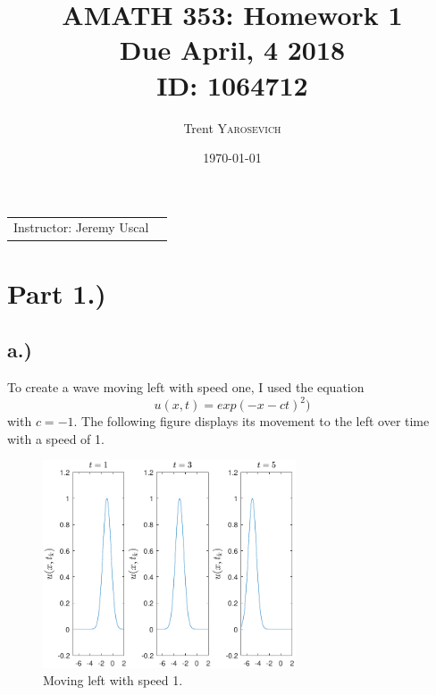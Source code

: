 \documentclass{article}
\title{AMATH 353: Homework 1 \\Due April, 4 2018 \\ ID: 1064712} %
\author{Trent \textsc{Yarosevich}} %
\date{\today} %
\begin{document}
\maketitle %
\setlength\parindent{1cm}

\begin{center}
\begin{tabular}{l r}
Instructor: Jeremy Uscal %
\end{tabular}
\end{center}



\section*{Part 1.)}
\subsection*{a.)}
To create a wave moving left with speed one, I used the equation 
\begin{equation}
u(x,t) = exp(-x - ct)^2) 
\end{equation}
with $c = -1$. The following figure displays its movement to the left over time with a speed of 1.
\begin{figure}[H]
\centering
    \includegraphics[width=75mm, scale=.8]{plot_1a.pdf}
	\caption{Moving left with speed 1.}
\end{figure}
\end{document}
